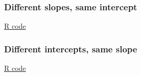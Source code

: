 \documentclass[handout]{beamer}
\begin{document}


   \begin{frame}
   \frametitle{Different slopes, same intercept}
   \begin{center}
   \end{center}
   \href{http://stats191.stanford.edu/interactions.html#minority-employment-data}{R code}
   \end{frame}



   \begin{frame}
   \frametitle{Different intercepts, same slope}
   \begin{center}
   \end{center}
   \href{http://stats191.stanford.edu/interactions.html#minority-employment-data}{R code}
   \end{frame}

\end{document}
